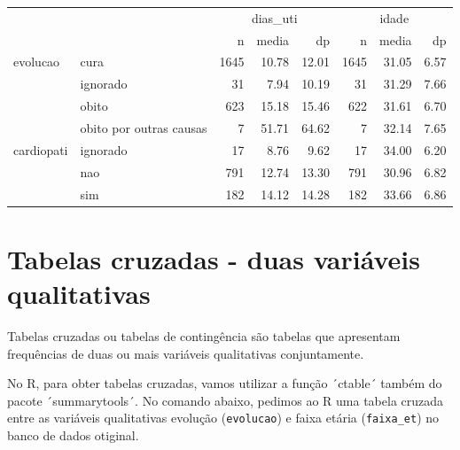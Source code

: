 \documentclass[
  letterpaper,
  DIV=11,
  numbers=noendperiod]{scrreprt}
\newenvironment{Shaded}{\begin{snugshade}}{\end{snugshade}}
\newcommand{\AttributeTok}[1]{\textcolor[rgb]{0.40,0.45,0.13}{#1}}
\newcommand{\FunctionTok}[1]{\textcolor[rgb]{0.28,0.35,0.67}{#1}}
\newcommand{\NormalTok}[1]{\textcolor[rgb]{0.00,0.23,0.31}{#1}}
\newcommand{\SpecialCharTok}[1]{\textcolor[rgb]{0.37,0.37,0.37}{#1}}
\newcommand{\StringTok}[1]{\textcolor[rgb]{0.13,0.47,0.30}{#1}}
\begin{document}
\begin{table}
\centering
\begin{tabular}[t]{llrrrrrr}
\toprule
\multicolumn{2}{c}{ } & \multicolumn{3}{c}{dias\_uti} & \multicolumn{3}{c}{idade} \\
\cmidrule(l{3pt}r{3pt}){3-5} \cmidrule(l{3pt}r{3pt}){6-8}
  &    & n & media & dp & n & media & dp\\
\midrule
evolucao & cura & \num{1645} & \num{10.78} & \num{12.01} & \num{1645} & \num{31.05} & \num{6.57}\\
 & ignorado & \num{31} & \num{7.94} & \num{10.19} & \num{31} & \num{31.29} & \num{7.66}\\
 & obito & \num{623} & \num{15.18} & \num{15.46} & \num{622} & \num{31.61} & \num{6.70}\\
 & obito por outras causas & \num{7} & \num{51.71} & \num{64.62} & \num{7} & \num{32.14} & \num{7.65}\\
cardiopati & ignorado & \num{17} & \num{8.76} & \num{9.62} & \num{17} & \num{34.00} & \num{6.20}\\
 & nao & \num{791} & \num{12.74} & \num{13.30} & \num{791} & \num{30.96} & \num{6.82}\\
 & sim & \num{182} & \num{14.12} & \num{14.28} & \num{182} & \num{33.66} & \num{6.86}\\
\bottomrule
\end{tabular}
\end{table}

\hypertarget{tabelas-cruzadas---duas-variuxe1veis-qualitativas}{%
\section{Tabelas cruzadas - duas variáveis
qualitativas}\label{tabelas-cruzadas---duas-variuxe1veis-qualitativas}}

Tabelas cruzadas ou tabelas de contingência são tabelas que apresentam
frequências de duas ou mais variáveis qualitativas conjuntamente.

No R, para obter tabelas cruzadas, vamos utilizar a função ´ctable´
também do pacote ´summarytools´. No comando abaixo, pedimos ao R uma
tabela cruzada entre as variáveis qualitativas evolução
(\texttt{evolucao}) e faixa etária (\texttt{faixa\_et}) no banco de
dados otiginal.

\begin{Shaded}
\end{Shaded}
\end{document}
